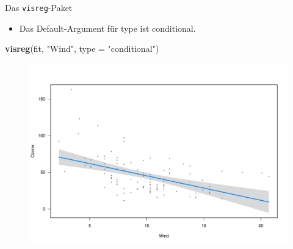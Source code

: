 \documentclass[ignorenonframetext,]{beamer}
\newenvironment{Shaded}{}{}
\newcommand{\KeywordTok}[1]{\textcolor[rgb]{0.00,0.44,0.13}{\textbf{{#1}}}}
\newcommand{\DataTypeTok}[1]{\textcolor[rgb]{0.56,0.13,0.00}{{#1}}}
\newcommand{\StringTok}[1]{\textcolor[rgb]{0.25,0.44,0.63}{{#1}}}
\newcommand{\NormalTok}[1]{{#1}}
\providecommand{\tightlist}{%
\setlength{\itemsep}{0pt}\setlength{\parskip}{0pt}}
\begin{document}
\begin{frame}[fragile]{Das \texttt{visreg}-Paket}

\begin{itemize}
\tightlist
\item
  Das Default-Argument für type ist conditional.
\end{itemize}

\begin{Shaded}
\begin{Highlighting}[]
\KeywordTok{visreg}\NormalTok{(fit, }\StringTok{"Wind"}\NormalTok{, }\DataTypeTok{type =} \StringTok{"conditional"}\NormalTok{)}
\end{Highlighting}
\end{Shaded}

\begin{figure}[htbp]
\centering
\includegraphics{RSocialScience2_files/figure-beamer/unnamed-chunk-82-1.pdf}
\caption{}
\end{figure}

\end{frame}
\end{document}
